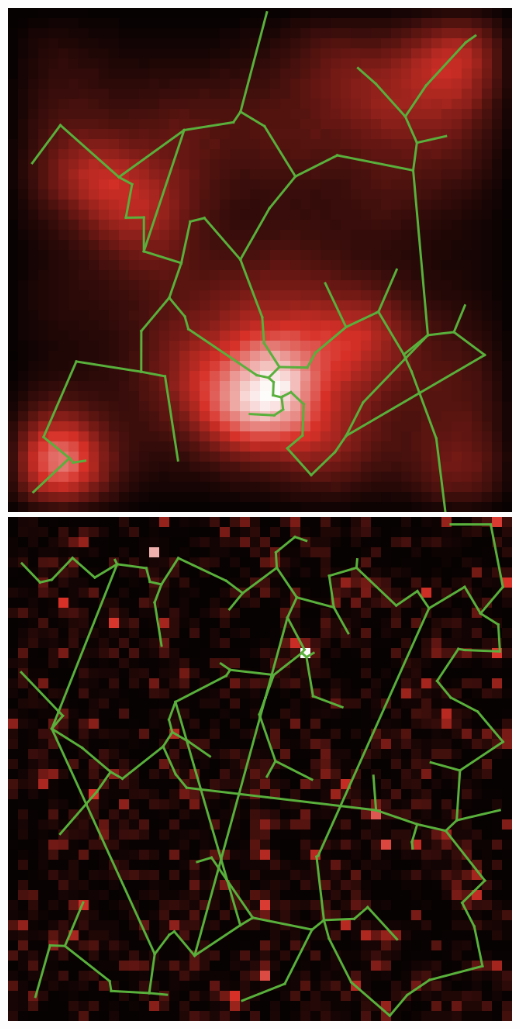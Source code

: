 \documentclass[english,11pt]{beamer}
\begin{document}
{\begin{columns}
\includegraphics[width=\textwidth]{figures/corr_2_param71913_seed10}\hspace{0.1cm}\\
\includegraphics[width=\textwidth]{figures/corr_3_param71918_seed0}

\end{columns}

}
\end{document}
